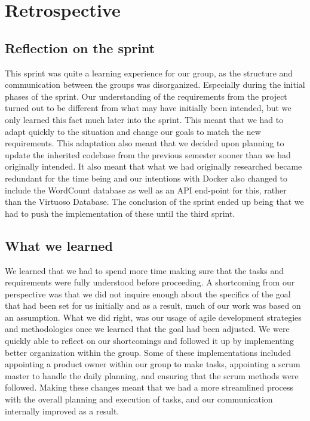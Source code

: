 \section{Retrospective}

\subsection{Reflection on the sprint}
This sprint was quite a learning experience for our group, as the structure and communication between the \knox{} groups was disorganized. Especially during the initial phases of the sprint. 
Our understanding of the requirements from the \knox{} project turned out to be different from what may have initially been intended, but we only learned this fact much later into the sprint. 
This meant that we had to adapt quickly to the situation and change our goals to match the new requirements. 
This adaptation also meant that we decided upon planning to update the inherited codebase from the previous semester sooner than we had originally intended. 
It also meant that what we had originally researched became redundant for the time being and our intentions with Docker also changed to include the WordCount database as well as an API end-point for this, rather than the Virtuoso Database. 
The conclusion of the sprint ended up being that we had to push the implementation of these until the third sprint.

\subsection{What we learned}
We learned that we had to spend more time making sure that the tasks and requirements were fully understood before proceeding. 
A shortcoming from our perspective was that we did not inquire enough about the specifics of the goal that had been set for us initially and as a result, much of our work was based on an assumption. 
What we did right, was our usage of agile development strategies and methodologies once we learned that the goal had been adjusted. 
We were quickly able to reflect on our shortcomings and followed it up by implementing better organization within the group. 
Some of these implementations included appointing a product owner within our group to make tasks, appointing a scrum master to handle the daily planning, and ensuring that the scrum methods were followed. 
Making these changes meant that we had a more streamlined process with the overall planning and execution of tasks, and our communication internally improved as a result.


